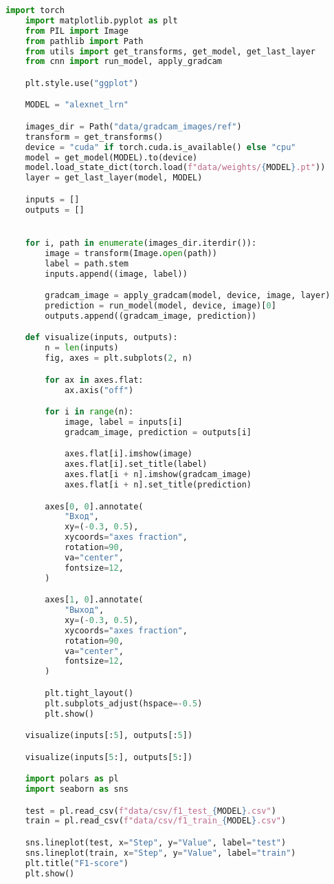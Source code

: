 \newpage
\begin{lstlisting}[language=python, caption={Файл visualize.ipynb}, label={listing:visualize}]
    import torch
    import matplotlib.pyplot as plt
    from PIL import Image
    from pathlib import Path
    from utils import get_transforms, get_model, get_last_layer
    from cnn import run_model, apply_gradcam

    plt.style.use("ggplot")

    MODEL = "alexnet_lrn"

    images_dir = Path("data/gradcam_images/ref")
    transform = get_transforms()
    device = "cuda" if torch.cuda.is_available() else "cpu"
    model = get_model(MODEL).to(device)
    model.load_state_dict(torch.load(f"data/weights/{MODEL}.pt"))
    layer = get_last_layer(model, MODEL)

    inputs = []
    outputs = []


    for i, path in enumerate(images_dir.iterdir()):
        image = transform(Image.open(path))
        label = path.stem
        inputs.append((image, label))

        gradcam_image = apply_gradcam(model, device, image, layer)
        prediction = run_model(model, device, image)[0]
        outputs.append((gradcam_image, prediction))

    def visualize(inputs, outputs):
        n = len(inputs)
        fig, axes = plt.subplots(2, n)

        for ax in axes.flat:
            ax.axis("off")

        for i in range(n):
            image, label = inputs[i]
            gradcam_image, prediction = outputs[i]

            axes.flat[i].imshow(image)
            axes.flat[i].set_title(label)
            axes.flat[i + n].imshow(gradcam_image)
            axes.flat[i + n].set_title(prediction)

        axes[0, 0].annotate(
            "Вход",
            xy=(-0.3, 0.5),
            xycoords="axes fraction",
            rotation=90,
            va="center",
            fontsize=12,
        )

        axes[1, 0].annotate(
            "Выход",
            xy=(-0.3, 0.5),
            xycoords="axes fraction",
            rotation=90,
            va="center",
            fontsize=12,
        )

        plt.tight_layout()
        plt.subplots_adjust(hspace=-0.5)
        plt.show()

    visualize(inputs[:5], outputs[:5])

    visualize(inputs[5:], outputs[5:])

    import polars as pl
    import seaborn as sns

    test = pl.read_csv(f"data/csv/f1_test_{MODEL}.csv")
    train = pl.read_csv(f"data/csv/f1_train_{MODEL}.csv")

    sns.lineplot(test, x="Step", y="Value", label="test")
    sns.lineplot(train, x="Step", y="Value", label="train")
    plt.title("F1-score")
    plt.show()
\end{lstlisting}
\newpage

